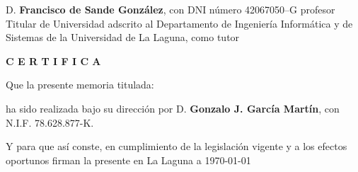 %
%
%
%

\newpage
\thispagestyle{empty}

D. {\bf Francisco de Sande González}, con DNI número 42067050--G
profesor Titular de Universidad adscrito al Departamento de Ingeniería Informática y de Sistemas
de la Universidad de La Laguna, como tutor

\bigskip
\bigskip
{\bf C E R T I F I C A}

\bigskip
\bigskip
\bigskip
Que la presente memoria titulada:

\bigskip
{\it \workTitle}

\bigskip
\bigskip
\bigskip

\noindent ha sido realizada bajo su dirección por D. {\bf Gonzalo J. García Martín},
con N.I.F. 78.628.877-K.

\bigskip
\bigskip

Y para que así conste, en cumplimiento de la legislación vigente y a los efectos
oportunos firman la presente en La Laguna a \today

